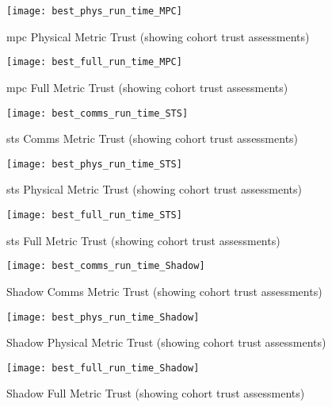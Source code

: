 \begin{figure}[h]
  \centering
  \texttt{[image: best\_phys\_run\_time\_MPC]}
  \caption{\gls{mpc} Physical Metric Trust (showing cohort trust assessments)}
  \label{fig:phys_time_mpc}
\end{figure}

\begin{figure}[h]
  \centering
  \texttt{[image: best\_full\_run\_time\_MPC]}
  \caption{\gls{mpc} Full Metric Trust (showing cohort trust assessments)}
  \label{fig:full_time_mpc}
\end{figure}


\begin{figure}[h]
  \centering
  \texttt{[image: best\_comms\_run\_time\_STS]}
  \caption{\gls{sts} Comms Metric Trust (showing cohort trust assessments)}
  \label{fig:comms_time_sts}
\end{figure}

\begin{figure}[h]
  \centering
  \texttt{[image: best\_phys\_run\_time\_STS]}
  \caption{\gls{sts} Physical Metric Trust (showing cohort trust assessments)}
  \label{fig:phys_time_sts}
\end{figure}

\begin{figure}[h]
  \centering
  \texttt{[image: best\_full\_run\_time\_STS]}
  \caption{\gls{sts} Full Metric Trust (showing cohort trust assessments)}
  \label{fig:full_time_sts}
\end{figure}



\begin{figure}[h]
  \centering
  \texttt{[image: best\_comms\_run\_time\_Shadow]}
  \caption{Shadow Comms Metric Trust (showing cohort trust assessments)}
  \label{fig:comms_time_shadow}
\end{figure}

\begin{figure}[h]
  \centering
  \texttt{[image: best\_phys\_run\_time\_Shadow]}
  \caption{Shadow Physical Metric Trust (showing cohort trust assessments)}
  \label{fig:phys_time_shadow}
\end{figure}

\begin{figure}[h]
  \centering
  \texttt{[image: best\_full\_run\_time\_Shadow]}
  \caption{Shadow Full Metric Trust (showing cohort trust assessments)}
  \label{fig:full_time_shadow}
\end{figure}



